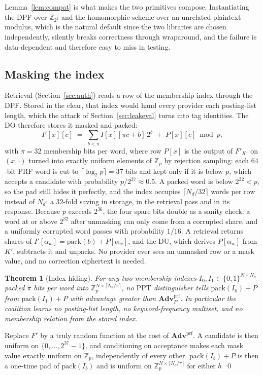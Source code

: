\documentclass[a4paper,fleqn]{cas-sc}
\newtheorem{theorem}{Theorem}
\newcommand{\PPT}{\mathrm{PPT}}
\newcommand{\advPRF}{\mathbf{Adv}^{\mathrm{prf}}}
\begin{document}
Lemma~\ref{lem:compat} is what makes the two primitives compose. Instantiating
the DPF over $\mathbb{Z}_{2^k}$ and the homomorphic scheme over an unrelated
plaintext modulus, which is the natural default since the two libraries are
chosen independently, silently breaks correctness through wraparound, and the
failure is data-dependent and therefore easy to miss in testing.

\subsection{Masking the index}
\label{sec:mask}
Retrieval (Section~\ref{sec:auth}) reads a row of the membership index through
the DPF. Stored in the clear, that index would hand every provider each
posting-list length, which the attack of Section~\ref{sec:leakeval} turns into
tag identities. The DO therefore stores it masked and packed:
\[
I'[x][c]\;=\;\sum_{b<\pi} I[x][\pi c+b]\,2^b \;+\; P[x][c] \bmod p ,
\]
with $\pi=32$ membership bits per word, where row $P[x]$ is the output of
$F'_{K'}$ on $(x,\cdot)$ turned into exactly uniform elements of
$\mathbb{Z}_p$ by rejection sampling: each $64$-bit PRF word is cut to
$\lceil\log_2 p\rceil=37$ bits and kept only if it is below $p$, which accepts
a candidate with probability $p/2^{37}\approx0.5$. A packed word is below
$2^{32}<p$, so the pad still hides it perfectly, and the index occupies
$\lceil N_d/32\rceil$ words per row instead of $N_d$: a $32$-fold saving in
storage, in the retrieval pass and in its response. Because $p$ exceeds $2^{36}$,
the four spare bits double as a sanity check: a word at or above $2^{32}$ after
unmasking can only come from a corrupted share, and a uniformly corrupted word
passes with probability $1/16$. A retrieval returns shares of
$I'[\alpha_w]=\mathrm{pack}(b)+P[\alpha_w]$, and the DU, which derives
$P[\alpha_w]$ from $K'$, subtracts it and unpacks. No provider ever sees an
unmasked row or a mask value, and no correction ciphertext is needed.

\begin{theorem}[Index hiding]
\label{thm:mask}
For any two membership indexes $I_0,I_1\in\{0,1\}^{N\times N_d}$ packed $\pi$ bits per word into $\mathbb{Z}_p^{N\times\lceil N_d/\pi\rceil}$, no $\PPT$
distinguisher tells $\mathrm{pack}(I_0)+P$ from $\mathrm{pack}(I_1)+P$ with advantage greater than
$\advPRF_{F'}$. In particular the coalition learns no posting-list length, no
keyword-frequency multiset, and no membership relation from the stored index.
\end{theorem}
\begin{pf}
Replace $F'$ by a truly random function at the cost of $\advPRF$. A candidate
is then uniform on $\{0,\dots,2^{37}-1\}$, and conditioning on acceptance makes
each mask value exactly uniform on $\mathbb{Z}_p$, independently of every
other. $\mathrm{pack}(I_b)+P$ is then a one-time pad of $\mathrm{pack}(I_b)$ and is uniform on
$\mathbb{Z}_p^{N\times\lceil N_d/\pi\rceil}$ for either $b$. \qed
\end{pf}
\end{document}
